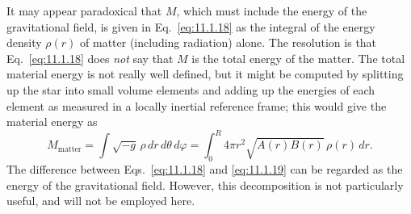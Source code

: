 It may appear paradoxical that \(M\), which must include the energy of the
gravitational field, is given in Eq.~\eqref{eq:11.1.18} as the integral of
the energy density \(\rho(r)\) of matter (including radiation) alone. The
resolution is that Eq.~\eqref{eq:11.1.18} does \emph{not} say that \(M\) is
the total energy of the matter. The total material energy is not really well
defined, but it might be computed by splitting up the star into small volume
elements and adding up the energies of each element as measured in a locally
inertial reference frame; this would give the material energy as
\begin{equation}
  M_{\mathrm{matter}}
  =
  \int\sqrt{-g}\,\rho\,dr\,d\theta\,d\varphi
  =
  \int_0^R4\pi r^2\sqrt{A(r)B(r)}\,\rho(r)\,dr.
  \tag{11.1.19}\label{eq:11.1.19}
\end{equation}
The difference between Eqs.~\eqref{eq:11.1.18} and \eqref{eq:11.1.19} can
be regarded as the energy of the gravitational field. However, this
decomposition is not particularly useful, and will not be employed here.

